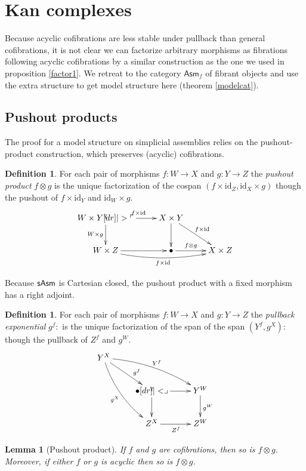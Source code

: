 \documentclass{amsart}
\theoremstyle{plain}
\newtheorem{lemma}[theorem]{Lemma}
\theoremstyle{definition}
\newtheorem{defin}[theorem]{Definition}
\newcommand\id{\mathrm{id}}
\newcommand\Asm{\mathsf{Asm}}
\begin{document}
\section{Kan complexes}
Because acyclic cofibrations are less stable under pullback than general cofibrations, it is not clear we can factorize arbitrary morphisms as fibrations following acyclic cofibrations by a similar construction as the one we used in proposition \ref{factor1}. We retreat to the category $\Asm_{f}$ of fibrant objects and use the extra structure to get model structure here (theorem \ref{modelcat}).

\subsection{Pushout products}
The proof for a model structure on simplicial assemblies relies on the pushout-product construction, which preserves (acyclic) cofibrations.

\begin{defin} For each pair of morphisms $f:W\to X$ and $g:Y\to Z$ the \emph{pushout product} $f\otimes g$ is the unique factorization of the cospan $(f\times \id_Z , \id_X\times g)$ though the pushout of $f\times \id_Y$ and $\id_W\times g$. 
\[\xymatrix{
W\times Y \ar[r]^{f\times \id} \ar[d]_{W\times g} \po & X\times Y \ar[d] \ar[dr]^{f\times \id} \\
W\times Z \ar[r] \ar@/_2ex/[rr]_{f\times\id} & \bullet \ar[r]^(.4){f\otimes g} & X\times Z
}\]
\end{defin}

Because $\mathsf{sAsm}$ is Cartesian closed, the pushout product with a fixed morphism has a right adjoint.

\begin{defin} For each pair of morphisms $f:W\to X$ and $g:Y\to Z$ the \emph{pullback exponential} $g^f: $ is the unique factorization of the span of the span $(Y^f, g^X): $ though the pullback of $Z^f$ and $g^W$. 
\[\xymatrix{
Y^X \ar@/^2ex/[drr]^{Y^f} \ar@/_2ex/[ddr]_{g^X}\ar[dr]^(.6){g^f} \\
& \bullet \ar[r]\ar[d]\pb & Y^W \ar[d]^{g^W} \\
& Z^X \ar[r]_{Z^f} & Z^W
}\]
\end{defin}

\begin{lemma}[Pushout product] If $f$ and $g$ are cofibrations, then so is $f\otimes g$. Moreover, if either $f$ or $g$ is acyclic then so is $f\otimes g$. \label{pushprod} \end{lemma}
\end{document}
